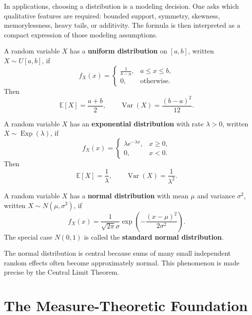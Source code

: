 In applications, choosing a distribution is a modeling decision. One asks which qualitative features are required: bounded support, symmetry, skewness, memorylessness, heavy tails, or additivity. The formula is then interpreted as a compact expression of those modeling assumptions.

\begin{definition}
A random variable $X$ has a \textbf{uniform distribution} on $[a,b]$, written $X\sim U[a,b]$, if
\[
    f_X(x)=
    \begin{cases}
    \frac{1}{b-a},&a\leq x\leq b,\\
    0,&\text{otherwise}.
    \end{cases}
\]
Then
\[
    \mathbb{E}[X]=\frac{a+b}{2},
    \qquad
    \operatorname{Var}(X)=\frac{(b-a)^2}{12}.
\]
\end{definition}

\begin{definition}
A random variable $X$ has an \textbf{exponential distribution} with rate $\lambda>0$, written $X\sim\operatorname{Exp}(\lambda)$, if
\[
    f_X(x)=
    \begin{cases}
    \lambda e^{-\lambda x},&x\geq 0,\\
    0,&x<0.
    \end{cases}
\]
Then
\[
    \mathbb{E}[X]=\frac{1}{\lambda},
    \qquad
    \operatorname{Var}(X)=\frac{1}{\lambda^2}.
\]
\end{definition}

\begin{definition}
A random variable $X$ has a \textbf{normal distribution} with mean $\mu$ and variance $\sigma^2$, written $X\sim N(\mu,\sigma^2)$, if
\[
    f_X(x)=\frac{1}{\sqrt{2\pi}\sigma}\exp\left(-\frac{(x-\mu)^2}{2\sigma^2}\right).
\]
The special case $N(0,1)$ is called the \textbf{standard normal distribution}.
\end{definition}

\begin{remark}
The normal distribution is central because sums of many small independent random effects often become approximately normal. This phenomenon is made precise by the Central Limit Theorem.
\end{remark}

\section{The Measure-Theoretic Foundation}


